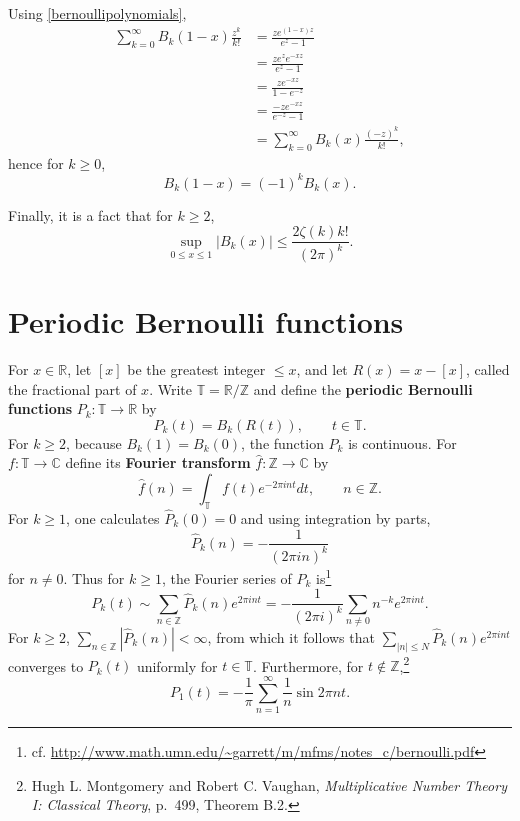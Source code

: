 \documentclass{article}
\theoremstyle{definition}
\begin{document}
Using \eqref{bernoullipolynomials},
\begin{align*}
\sum_{k=0}^\infty B_k(1-x) \frac{z^k}{k!} &= \frac{ze^{(1-x)z}}{e^z-1}\\
&=\frac{ze^z e^{-xz}}{e^z-1}\\
&=\frac{ze^{-xz}}{1-e^{-z}}\\
&=\frac{-ze^{-xz}}{e^{-z}-1}\\
&=\sum_{k=0}^\infty B_k(x) \frac{(-z)^k}{k!},
\end{align*}
hence for $k \geq 0$,
\[
B_k(1-x) = (-1)^k B_k(x).
\]

Finally, it is a fact that for $k \geq 2$,
\begin{equation}
\sup_{0 \leq x \leq 1} |B_k(x)| \leq \frac{2\zeta(k) k!}{(2\pi)^k}.
\label{supremum}
\end{equation}


\section{Periodic Bernoulli functions}
For $x \in \mathbb{R}$, let $[ x ]$ be the greatest integer $\leq x$, and let $R(x)=x-[x]$, called the fractional part of $x$.
Write $\mathbb{T}=\mathbb{R}/\mathbb{Z}$ and define the 
\textbf{periodic Bernoulli functions} $P_k:\mathbb{T} \to \mathbb{R}$ by
\[
P_k(t) = B_k(R(t)),\qquad t \in \mathbb{T}.
\] 
For $k \geq 2$, because $B_k(1)=B_k(0)$, the function $P_k$ is continuous. 
For $f:\mathbb{T} \to \mathbb{C}$ define its \textbf{Fourier transform} $\widehat{f}:\mathbb{Z} \to \mathbb{C}$ by
\[
\widehat{f}(n) = \int_\mathbb{T} f(t) e^{-2\pi int} dt,\qquad n \in \mathbb{Z}.
\]
For $k \geq 1$, one calculates $\widehat{P}_k(0)=0$ and using integration by parts,
\[
\widehat{P}_k(n)= - \frac{1}{(2\pi in)^k}
\]
for
$n \neq 0$.
Thus for $k \geq 1$, the Fourier series of $P_k$ is\footnote{cf. \url{http://www.math.umn.edu/~garrett/m/mfms/notes_c/bernoulli.pdf}}
\[
P_k(t) \sim \sum_{n \in \mathbb{Z}} \widehat{P}_k(n) e^{2\pi int} = -\frac{1}{(2\pi i)^k} \sum_{n \neq 0} n^{-k} e^{2\pi int}.
\]
For $k \geq 2$, $\sum_{n \in \mathbb{Z}} |\widehat{P}_k(n)|<\infty$, from which it follows that $\sum_{|n| \leq N}  \widehat{P}_k(n) e^{2\pi int}$
converges to $P_k(t)$ uniformly for $t \in \mathbb{T}$.
Furthermore, for $t \not \in \mathbb{Z}$,\footnote{Hugh L. Montgomery and Robert C. Vaughan,
{\em Multiplicative Number Theory I: Classical Theory}, p.~499, Theorem B.2.}
\[
P_1(t) = - \frac{1}{\pi} \sum_{n=1}^\infty \frac{1}{n} \sin 2\pi nt.
\]
\end{document}
